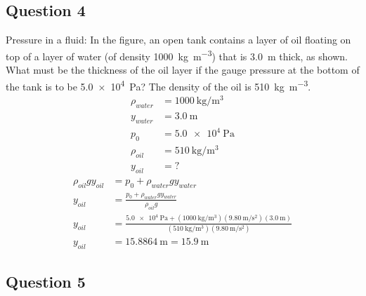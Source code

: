 \documentclass{article}
\begin{document}
\subsection{Question 4}

Pressure in a fluid: In the figure, an open tank contains a layer of oil floating on top of a layer of water (of density \SI{1000}{\kilogram \per \meter \cubed}) that is \SI{3.0}{\meter} thick, as shown. What must be the thickness of the oil layer if the gauge pressure at the bottom of the tank is to be \SI{5.0e4}{\pascal}? The density of the oil is \SI{510}{\kilogram \per \meter \cubed}.
\begin{align*}
	\rho_{water} & = \SI{1000}{\kilogram \per \meter \cubed} \\
	y_{water} & = \SI{3.0}{\meter} \\
	p_0 & = \SI{5.0e4}{\pascal} \\
	\rho_{oil} & = \SI{510}{\kilogram \per \meter \cubed} \\
	y_{oil} & = ?
\end{align*}
\begin{align*}
	\rho_{oil}gy_{oil} & = p_0 + \rho_{water}gy_{water} \\
	y_{oil} & = \frac{ p_0 + \rho_{water}gy_{water} }{ \rho_{oil}g } \\
	y_{oil} & = \frac{ \SI{5.0e4}{\pascal} + (\SI{1000}{\kilogram \per \meter \cubed})(\SI{9.80}{\meter \per \second \squared})(\SI{3.0}{\meter}) }{ (\SI{510}{\kilogram \per \meter \cubed})(\SI{9.80}{\meter \per \second \squared}) } \\
	y_{oil} & = \SI{15.8864}{\meter} = \SI{15.9}{\meter}
\end{align*}

\subsection{Question 5}
\end{document}
